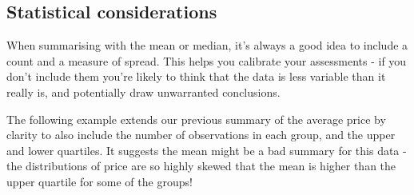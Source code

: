 \subsection{Statistical considerations}

When summarising with the mean or median, it's always a good idea to
include a count and a measure of spread. This helps you calibrate your
assessments - if you don't include them you're likely to think that the
data is less variable than it really is, and potentially draw
unwarranted conclusions.

The following example extends our previous summary of the average price
by clarity to also include the number of observations in each group, and
the upper and lower quartiles. It suggests the mean might be a bad
summary for this data - the distributions of price are so highly skewed
that the mean is higher than the upper quartile for some of the groups!

\begin{Shaded}
\end{Shaded}

